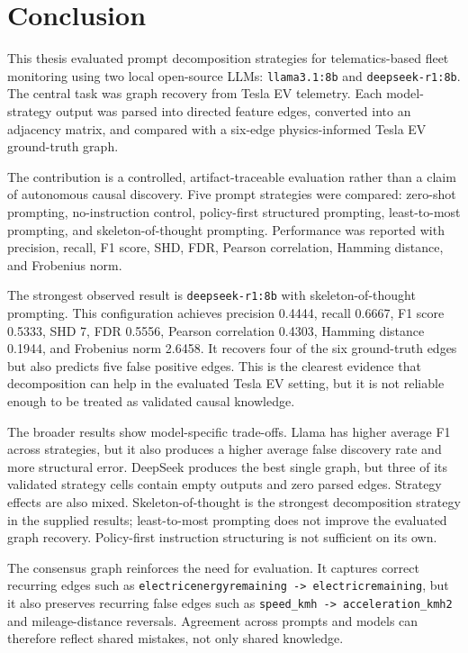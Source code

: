 \chapter{Conclusion}
\label{sec:conclusion}

This thesis evaluated prompt decomposition strategies for telematics-based
fleet monitoring using two local open-source LLMs:
\texttt{llama3.1:8b} and \texttt{deepseek-r1:8b}. The central task was graph
recovery from Tesla EV telemetry. Each model-strategy output was parsed into
directed feature edges, converted into an adjacency matrix, and compared with
a six-edge physics-informed Tesla EV ground-truth graph.

The contribution is a controlled, artifact-traceable evaluation rather than a
claim of autonomous causal discovery. Five prompt strategies were compared:
zero-shot prompting, no-instruction control, policy-first structured
prompting, least-to-most prompting, and skeleton-of-thought prompting.
Performance was reported with precision, recall, F1 score, SHD, FDR, Pearson
correlation, Hamming distance, and Frobenius norm.

The strongest observed result is \texttt{deepseek-r1:8b} with
skeleton-of-thought prompting. This configuration achieves precision 0.4444,
recall 0.6667, F1 score 0.5333, SHD 7, FDR 0.5556, Pearson correlation
0.4303, Hamming distance 0.1944, and Frobenius norm 2.6458. It recovers four
of the six ground-truth edges but also predicts five false positive edges.
This is the clearest evidence that decomposition can help in the evaluated
Tesla EV setting, but it is not reliable enough to be treated as validated
causal knowledge.

The broader results show model-specific trade-offs. Llama has higher average
F1 across strategies, but it also produces a higher average false discovery
rate and more structural error. DeepSeek produces the best single graph, but
three of its validated strategy cells contain empty outputs and zero parsed
edges. Strategy effects are also mixed. Skeleton-of-thought is the strongest
decomposition strategy in the supplied results; least-to-most prompting does
not improve the evaluated graph recovery. Policy-first instruction structuring
is not sufficient on its own.

The consensus graph reinforces the need for evaluation. It captures correct
recurring edges such as \texttt{electricenergyremaining -> electricremaining},
but it also preserves recurring false edges such as
\texttt{speed\_kmh -> acceleration\_kmh2} and mileage-distance reversals.
Agreement across prompts and models can therefore reflect shared mistakes,
not only shared knowledge.

